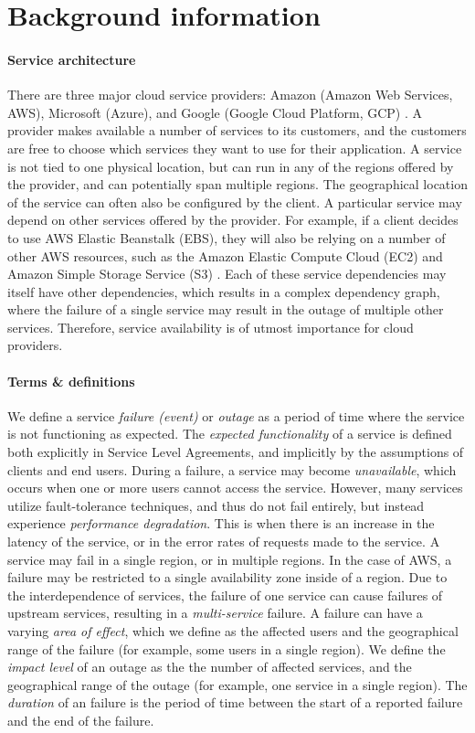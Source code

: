 \section{Background information}
\paragraph{Service architecture}
There are three major cloud service providers: Amazon (Amazon Web Services, AWS), Microsoft (Azure), and Google (Google Cloud Platform, GCP) \cite{dignan2020, jones2020}.
A provider makes available a number of services to its customers, and the customers are free to choose which services they want to use for their application.
A service is not tied to one physical location, but can run in any of the regions offered by the provider, and can potentially span multiple regions.
The geographical location of the service can often also be configured by the client.
A particular service may depend on other services offered by the provider.
For example, if a client decides to use AWS Elastic Beanstalk (EBS), they will also be relying on a number of other AWS resources, such as the Amazon Elastic Compute Cloud (EC2) and Amazon Simple Storage Service (S3) \cite{awsFaq}.
Each of these service dependencies may itself have other dependencies, which results in a complex dependency graph, where the failure of a single service may result in the outage of multiple other services.
Therefore, service availability is of utmost importance for cloud providers.

\paragraph{Terms \& definitions}
We define a service \textit{failure (event)} or \textit{outage} as a period of time where the service is not functioning as expected.
The \textit{expected functionality} of a service is defined both explicitly in Service Level Agreements, and implicitly by the assumptions of clients and end users.
During a failure, a service may become \textit{unavailable}, which occurs when one or more users cannot access the service.
However, many services utilize fault-tolerance techniques, and thus do not fail entirely, but instead experience \textit{performance degradation}.
This is when there is an increase in the latency of the service, or in the error rates of requests made to the service.
A service may fail in a single region, or in multiple regions.
In the case of AWS, a failure may be restricted to a single availability zone inside of a region.
Due to the interdependence of services, the failure of one service can cause failures of upstream services, resulting in a \textit{multi-service} failure.
A failure can have a varying \textit{area of effect}, which we define as the affected users and the geographical range of the failure (for example, some users in a single region).
We define the \textit{impact level} of an outage as the the number of affected services, and the geographical range of the outage (for example, one service in a single region).
The \textit{duration} of an failure is the period of time between the start of a reported failure and the end of the failure.
